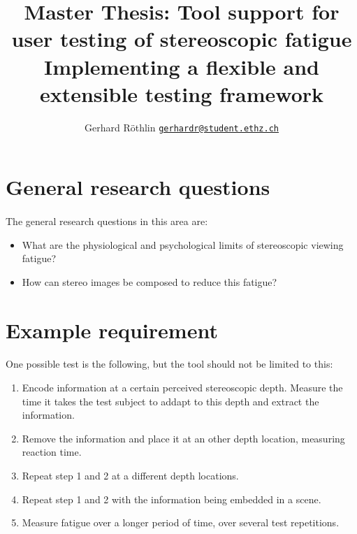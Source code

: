 \documentclass[11pt]{scrartcl}
\title{Master Thesis: Tool support for user testing of stereoscopic fatigue\\
{\large Implementing a flexible and extensible testing framework}}
\author{\normalsize Gerhard R\"othlin 
{\tt  \href{mailto:gerhardr@student.ethz.ch}{gerhardr@student.ethz.ch}}}
\date{}
\begin{document}
\maketitle



\begin{multicols}{2}


\section{General research questions}
\paragraph{}
The general research questions in this area are:
\begin{itemize}
\item What are the physiological and psychological limits of stereoscopic viewing fatigue?
\item How can stereo images be composed to reduce this fatigue?
\end{itemize}

\section{Example requirement}
\paragraph{}
One possible test is the following, but the tool should not be limited to this:

\begin{enumerate}
\item Encode information at a certain perceived stereoscopic depth. Measure the time it takes the test subject to addapt to this depth and extract the information.
\item Remove the information and place it at an other depth location, measuring reaction time.
\item Repeat step 1 and 2 at a different depth locations.
\item Repeat step 1 and 2 with the information being embedded in a scene.
\item Measure fatigue over a longer period of time, over several test repetitions.
\end{enumerate}


\end{multicols}
\end{document}

